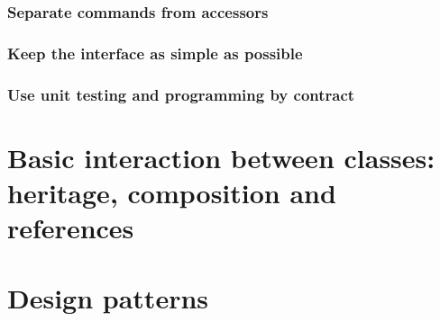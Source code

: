 \documentclass[12pt]{article}
\begin{document}
\subsubsection{Separate commands from accessors}


\subsubsection{Keep the interface as simple as possible}
\subsubsection{Use unit testing and programming by contract}

\section{Basic interaction between classes: heritage, composition and references}

\section{Design patterns}
\end{document}
